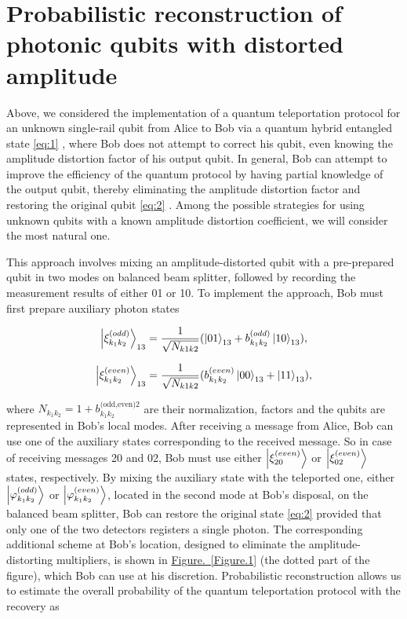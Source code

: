 \documentclass{optica-article}
\begin{document}
\section{Probabilistic reconstruction of photonic qubits with distorted amplitude}



Above, we considered the implementation of a quantum teleportation protocol for an unknown single-rail qubit from Alice to Bob via a quantum hybrid entangled state \eqref{eq:1} , where Bob does not attempt to correct his qubit, even knowing the amplitude distortion factor of his output qubit. In general, Bob can attempt to improve the efficiency of the quantum protocol by having partial knowledge of the output qubit, thereby eliminating the amplitude distortion factor and restoring the original qubit \eqref{eq:2} . Among the possible strategies for using unknown qubits with a known amplitude distortion coefficient, we will consider the most natural one. 
\par This approach involves mixing an amplitude-distorted qubit with a pre-prepared qubit in two modes on balanced beam splitter, followed by recording the measurement results of either 01 or 10. To implement the approach, Bob must first prepare auxiliary photon states




\begin{equation}\label{eq:27}
     \ket{\xi_{k_1k_2}^{(odd)}}_{13} = 
    \frac{1}{\sqrt{N_{k1k2}}}(\ket{01}_{13} + b^{(odd)}_{k_1k_2}\ket{10}_{13}),  
\end{equation}


\begin{equation}\label{eq:28}
     \ket{\xi_{k_1k_2}^{(even)}}_{13} = 
    \frac{1}{\sqrt{N_{k1k2}}}(b^{(even)}_{k_1k_2}\ket{00}_{13} + \ket{11}_{13}),  
\end{equation}

\!\!\!\!\!\!where $N_{k_1 k_2}=1+b_{k_1 k_2}^{\text{(odd,even)}2}$ are their normalization, factors and the qubits are represented in Bob’s local modes. After receiving a message from Alice, Bob can use one of the auxiliary states corresponding to the received message. So in case of receiving messages 20 and 02, Bob must use either $\ket{\xi_{20}^{(even)}}$ or $\ket{\xi_{02}^{(even)}}$ states, respectively.   
By mixing the auxiliary state with the teleported one, either $\ket{\varphi_{k_1k_2}^{(odd)}}$ or $\ket{\varphi_{k_1k_2}^{(even)}}$, located in the second mode at Bob's disposal, on the balanced beam splitter, Bob can restore the original state \eqref{eq:2}  provided that only one of the two detectors registers a single photon. The corresponding additional scheme at Bob's location, designed to eliminate the amplitude-distorting multipliers, is shown in \hyperref[Figure.1]{Figure.~\ref*{Figure.1}} (the dotted part of the figure), which Bob can use at his discretion. Probabilistic reconstruction allows us to estimate the overall probability of the quantum teleportation protocol with the recovery as 
\end{document}
